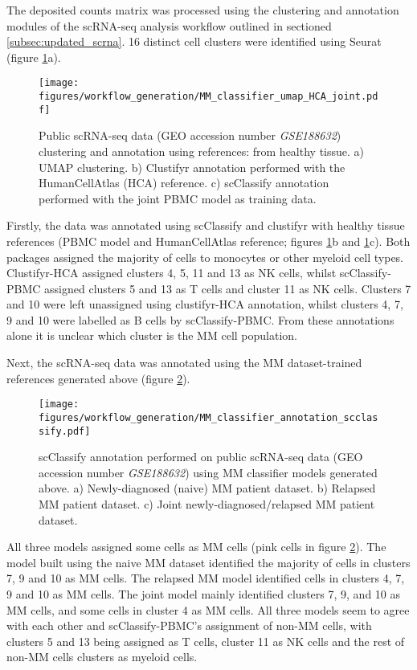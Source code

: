The deposited counts matrix was processed using the clustering and annotation modules of the scRNA-seq analysis workflow outlined in sectioned \ref{subsec:updated_scrna}.
16 distinct cell clusters were identified using Seurat (figure \ref{fig:mm_class_umap_annotate}a).
\begin{figure}[htb]
\centering
\texttt{[image: figures/workflow\_generation/MM\_classifier\_umap\_HCA\_joint.pdf]}
\caption[Public scRNA-seq data clustering and annotation]{Public scRNA-seq data (GEO accession number \textit{GSE188632}) clustering and annotation using references: from healthy tissue.
a) UMAP clustering.
b) Clustifyr annotation performed with the HumanCellAtlas (HCA) reference.
c) scClassify annotation performed with the joint PBMC model as training data.
}
\label{fig:mm_class_umap_annotate}
\end{figure}
%
Firstly, the data was annotated using scClassify and clustifyr with healthy tissue references (PBMC model and HumanCellAtlas reference; figures \ref{fig:mm_class_umap_annotate}b and \ref{fig:mm_class_umap_annotate}c).
Both packages assigned the majority of cells to monocytes or other myeloid cell types.
Clustifyr-HCA assigned clusters 4, 5, 11 and 13 as NK cells, whilst scClassify-PBMC assigned clusters 5 and 13 as T cells and cluster 11 as NK cells.
Clusters 7 and 10 were left unassigned using clustifyr-HCA annotation, whilst clusters 4, 7, 9 and 10 were labelled as B cells by scClassify-PBMC.
From these annotations alone it is unclear which cluster is the MM cell population.

Next, the scRNA-seq data was annotated using the MM dataset-trained references generated above (figure \ref{fig:mm_classifier_scclassify_annotate}).
%
\begin{figure}[htb]
\centering
\texttt{[image: figures/workflow\_generation/MM\_classifier\_annotation\_scclassify.pdf]}
\caption[Public scRNA-seq data MM classifier annotation]{scClassify annotation performed on public scRNA-seq data (GEO accession number \textit{GSE188632}) using MM classifier models generated above.
a) Newly-diagnosed (naive) MM patient dataset.
b) Relapsed MM patient dataset.
c) Joint newly-diagnosed/relapsed MM patient dataset.
}
\label{fig:mm_classifier_scclassify_annotate}
\end{figure}
%
All three models assigned some cells as MM cells (pink cells in figure \ref{fig:mm_classifier_scclassify_annotate}).
The model built using the naive MM dataset identified the majority of cells in clusters 7, 9 and 10 as MM cells.
The relapsed MM model identified cells in clusters 4, 7, 9 and 10 as MM cells.
The joint model mainly identified clusters 7, 9, and 10 as MM cells, and some cells in cluster 4 as MM cells.
All three models seem to agree with each other and scClassify-PBMC's assignment of non-MM cells, with clusters 5 and 13 being assigned as T cells, cluster 11 as NK cells and the rest of non-MM cells clusters as myeloid cells.

